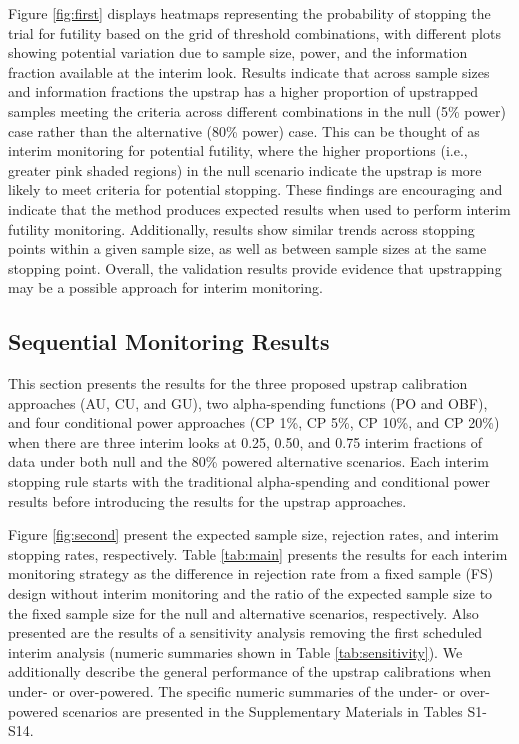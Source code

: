 \documentclass[Afour,sageh,times,square,numbers]{sagej}
\begin{document}
Figure \ref{fig:first} displays heatmaps representing the probability of stopping the trial for futility based on the grid of threshold combinations, with different plots showing potential variation due to sample size, power, and the information fraction available at the interim look.  Results indicate that across sample sizes and information fractions the upstrap has a higher proportion of upstrapped samples meeting the criteria across different combinations in the null (5\% power) case rather than the alternative (80\% power) case. This can be thought of as interim monitoring for potential futility, where the higher proportions (i.e., greater pink shaded regions) in the null scenario indicate the upstrap is more likely to meet criteria for potential stopping.  These findings are encouraging and indicate that the method produces expected results when used to perform interim futility monitoring.  Additionally, results show similar trends across stopping points within a given sample size, as well as between sample sizes at the same stopping point.  Overall, the validation results provide evidence that upstrapping may be a possible approach for interim monitoring.


\subsection{Sequential Monitoring Results}

This section presents the results for the three proposed upstrap calibration approaches (AU, CU, and GU), two alpha-spending functions (PO and OBF), and four conditional power approaches (CP 1\%, CP 5\%, CP 10\%, and CP 20\%) when there are three interim looks at 0.25, 0.50, and 0.75 interim fractions of data under both null and the 80\% powered alternative scenarios. Each interim stopping rule starts with the traditional alpha-spending and conditional power results before introducing the results for the upstrap approaches.

Figure \ref{fig:second} present the expected sample size, rejection rates, and interim stopping rates, respectively. Table \ref{tab:main} presents the results for each interim monitoring strategy as the difference in rejection rate from a fixed sample (FS) design without interim monitoring and the ratio of the expected sample size to the fixed sample size for the null and alternative scenarios, respectively.  Also presented are the results of a sensitivity analysis removing the first scheduled interim analysis (numeric summaries shown in Table \ref{tab:sensitivity}). We additionally describe the general performance of the upstrap calibrations when under- or over-powered.  The specific numeric summaries of the under-  or over-powered scenarios are presented in the Supplementary Materials in Tables S1-S14. 
\end{document}
